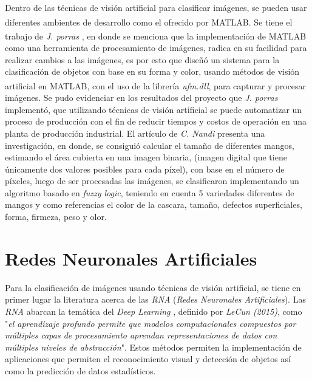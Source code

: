 Dentro de las técnicas de visión artificial para clasificar imágenes, se pueden usar diferentes ambientes de desarrollo como el ofrecido por MATLAB\textsuperscript{\textregistered}. Se tiene el trabajo de \textit{J. porras} \cite{article3}, en donde se menciona que la implementación de MATLAB\textsuperscript{\textregistered} como una herramienta de procesamiento de imágenes, radica en su facilidad para realizar cambios a las imágenes, es por esto que diseñó un sistema para la clasificación de objetos con base en su forma y color, usando métodos de visión artificial en MATLAB\textsuperscript{\textregistered}, con el uso de la librería \textit{ufm.dll}, para capturar y procesar imágenes. Se pudo evidenciar en los resultados del proyecto que \textit{J. porras} implementó, que utilizando técnicas de visión artificial se puede automatizar un proceso de producción con el fin de reducir tiempos y costos de operación en una planta de producción industrial. El artículo de \textit{C. Nandi} \cite{inproceedings} presenta una investigación, en donde, se consiguió calcular el tamaño de diferentes mangos, estimando el área cubierta en una imagen binaria, (imagen digital que tiene únicamente dos valores posibles para cada píxel), con base en el número de píxeles, luego de ser procesadas las imágenes, se clasificaron implementando un algoritmo basado en \textit{fuzzy logic}, teniendo en cuenta 5 variedades diferentes de mangos y como referencias el color de la cascara, tamaño, defectos superficiales, forma, firmeza, peso y olor.\\

\section{Redes Neuronales Artificiales}

Para la clasificación de imágenes usando técnicas de visión artificial, se tiene en primer lugar la literatura  acerca de las \textit{RNA} (\textit{Redes Neuronales Artificiales}). Las \textit{RNA} abarcan la temática del \textit{Deep Learning} \cite{lecun2015deep}, definido por \textit{LeCun (2015)}, como "\textit{el aprendizaje profundo permite que modelos computacionales compuestos por múltiples capas de procesamiento aprendan representaciones de datos con múltiples niveles de abstracción}". Estos métodos permiten la implementación de aplicaciones que permiten el reconocimiento visual y detección de objetos así como la predicción de datos estadísticos.\\ 

